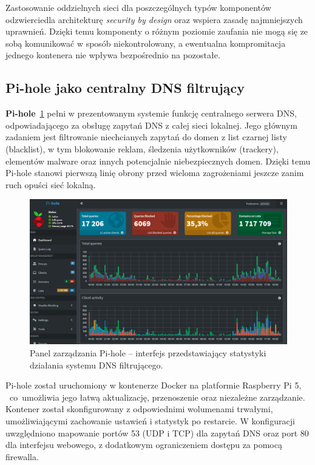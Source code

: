 \documentclass[
    left=2.5cm,         %
    right=2.5cm,        %
    top=2.5cm,          %
    bottom=3cm,         %
    bindingoffset=6mm,  %
    nohyphenation=true %
]{eiti/eiti-thesis} %
\begin{document}
Zastosowanie oddzielnych sieci dla poszczególnych typów komponentów odzwierciedla architekturę \textit{security by design} oraz wspiera zasadę najmniejszych uprawnień. Dzięki temu komponenty o różnym poziomie zaufania nie mogą się ze sobą komunikować w sposób niekontrolowany, a ewentualna kompromitacja jednego kontenera nie wpływa bezpośrednio na pozostałe.

\newpage 
\subsection{Pi-hole jako centralny DNS filtrujący}

\textbf{Pi-hole}~\ref{fig:pihole-dashboard} pełni w prezentowanym systemie funkcję centralnego serwera DNS, odpowiadającego za obsługę zapytań DNS z całej sieci lokalnej. Jego głównym zadaniem jest filtrowanie niechcianych zapytań do domen z list czarnej listy (blacklist), w tym blokowanie reklam, śledzenia użytkowników (trackery), elementów malware oraz innych potencjalnie niebezpiecznych domen. Dzięki temu Pi-hole \cite{pihole-docs} stanowi pierwszą linię obrony przed wieloma zagrożeniami jeszcze zanim ruch opuści sieć lokalną.
\begin{figure}[H]
    \centering
    \includegraphics[width=\textwidth]{img/pihole.png}
    \caption{Panel zarządzania Pi-hole – interfejs przedstawiający statystyki działania systemu DNS filtrującego.}
    \label{fig:pihole-dashboard}
\end{figure}


Pi-hole został uruchomiony w kontenerze Docker na platformie Raspberry Pi 5, ~co~umożliwia jego łatwą aktualizację, przenoszenie oraz niezależne zarządzanie. Kontener został skonfigurowany z odpowiednimi wolumenami trwałymi, umożliwiającymi zachowanie ustawień i statystyk po restarcie\cite{config-pihole}. W konfiguracji uwzględniono mapowanie portów 53 (UDP i TCP) dla zapytań DNS oraz port 80 dla interfejsu webowego, z dodatkowym ograniczeniem dostępu za pomocą firewalla.
\end{document}
